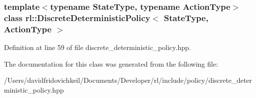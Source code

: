 \subsubsection*{template$<$typename State\+Type, typename Action\+Type$>$\newline
class rl\+::\+Discrete\+Deterministic\+Policy$<$ State\+Type, Action\+Type $>$}



Definition at line 59 of file discrete\+\_\+deterministic\+\_\+policy.\+hpp.



The documentation for this class was generated from the following file\+:\begin{DoxyCompactItemize}
\item 
/\+Users/davidfridovichkeil/\+Documents/\+Developer/rl/include/policy/discrete\+\_\+deterministic\+\_\+policy.\+hpp\end{DoxyCompactItemize}
